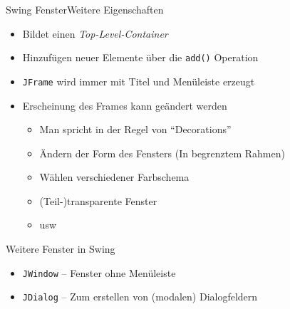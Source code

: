 \begin{frame}{Swing Fenster}{Weitere Eigenschaften}
    \begin{itemize}
        \item Bildet einen \textit{Top-Level-Container}
        \item Hinzufügen neuer Elemente über die \texttt{add()} Operation
        \item \texttt{JFrame} wird immer mit Titel und Menüleiste erzeugt
        \item Erscheinung des Frames kann geändert werden
        \begin{itemize}
            \item Man spricht in der Regel von "`Decorations"'
            \item Ändern der Form des Fensters (In begrenztem Rahmen)
            \item Wählen verschiedener Farbschema
            \item (Teil-)transparente Fenster
            \item usw
        \end{itemize}
    \end{itemize}
\end{frame}

\begin{frame}{Weitere Fenster in Swing}
    \begin{itemize}
        \item \texttt{JWindow} -- Fenster ohne Menüleiste
        \item \texttt{JDialog} -- Zum erstellen von (modalen) Dialogfeldern
    \end{itemize}
\end{frame}